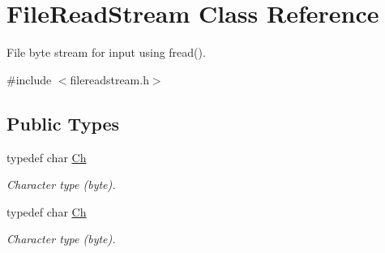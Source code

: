 \hypertarget{class_file_read_stream}{}\section{File\+Read\+Stream Class Reference}
\label{class_file_read_stream}


File byte stream for input using fread().  




{\ttfamily \#include $<$filereadstream.\+h$>$}

\subsection*{Public Types}
\begin{DoxyCompactItemize}
\item 
typedef char \hyperlink{class_file_read_stream_ae1f83d9ca3c76d1d151af0b6c427f046}{Ch}\hypertarget{class_file_read_stream_ae1f83d9ca3c76d1d151af0b6c427f046}{}\label{class_file_read_stream_ae1f83d9ca3c76d1d151af0b6c427f046}

\begin{DoxyCompactList}\small\item\em Character type (byte). \end{DoxyCompactList}\item 
typedef char \hyperlink{class_file_read_stream_ae1f83d9ca3c76d1d151af0b6c427f046}{Ch}\hypertarget{class_file_read_stream_ae1f83d9ca3c76d1d151af0b6c427f046}{}\label{class_file_read_stream_ae1f83d9ca3c76d1d151af0b6c427f046}

\begin{DoxyCompactList}\small\item\em Character type (byte). \end{DoxyCompactList}\end{DoxyCompactItemize}
